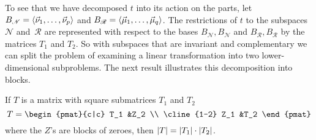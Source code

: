 To see that we have decomposed \( t \) into its action on the parts, 
let $B_{\mathscr{N}}=\langle\vec{\nu}_1,\dots,\vec{\nu}_p\rangle$ and 
$B_{\mathscr{R}}=\langle\vec{\mu}_1,\ldots,\vec{\mu}_q\rangle$.
The restrictions of \( t \) to the subspaces \( \mathscr{N} \) 
and~\( \mathscr{R} \) 
are represented
with respect to the bases $B_{\mathscr{N}},B_{\mathscr{N}}$
and $B_{\mathscr{R}},B_{\mathscr{R}}$
by the matrices \( T_1 \) and \( T_2 \).
So with subspaces that are invariant and complementary 
we can split the problem of examining
a linear transformation into two lower-dimensional subproblems.
The next result illustrates this decomposition into blocks.

\begin{lemma} \label{le:DetIsProdOfSubDets}
If $T$ is a matrix with square submatrices $T_1$ and $T_2$
\begin{equation*} \renewcommand{\arraystretch}{1.2}
  T=
  \begin{pmat}{c|c}
      T_1   &Z_2  \\  \cline{1-2}
      Z_1   &T_2
   \end{pmat}
\end{equation*}
where the \( Z \)'s are blocks of zeroes,
then \( \deter{T}=\deter{T_1}\cdot\deter{T_2} \).
\end{lemma}

